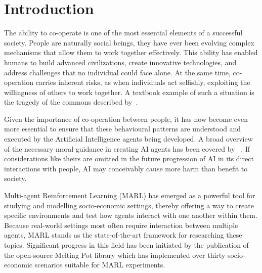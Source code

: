 \documentclass[pdflatex,sn-basic,lineno]{sn-jnl}
\theoremstyle{thmstyleone}%
\theoremstyle{thmstyletwo}%
\theoremstyle{thmstylethree}%
\begin{document}
\section{Introduction}\label{sec1}

The ability to co-operate is one of the most essential elements of a successful society. People are naturally social
beings, they have ever been evolving complex mechanisms that allow them to work together effectively. This ability has
enabled humans to build advanced civilizations, create innovative technologies, and address challenges that no
individual could face alone. At the same time, co-operation carries inherent risks, as when individuals act selfishly,
exploiting the willingness of others to work together. A textbook example of such a situation is the tragedy of the
commons described by~\cite{hardin1968tragedy}.

Given the importance of co-operation between people, it has now become even more essential to ensure that these
behavioural patterns are understood and executed by the Artificial Intelligence agents being developed. A broad overview
of the necessary moral guidance in creating AI agents has been covered by ~\cite{Bostrom2018}. If considerations like
theirs are omitted in the future progression of AI in its direct interactions with people, AI may conceivably cause more
harm than benefit to society.

Multi-agent Reinforcement Learning (MARL) has emerged as a powerful tool for studying and modelling socio-economic
settings, thereby offering a way to create specific environments and test how agents interact with one another within
them. Because real-world settings most often require interaction between multiple agents, MARL stands as the
state-of-the-art framework for researching these topics. Significant progress in this field has been initiated by the
publication of the open-source Melting Pot library \citep{Leibo2021, agapiou2023meltingpot20} which has implemented over
thirty socio-economic scenarios suitable for MARL experiments.
\end{document}
